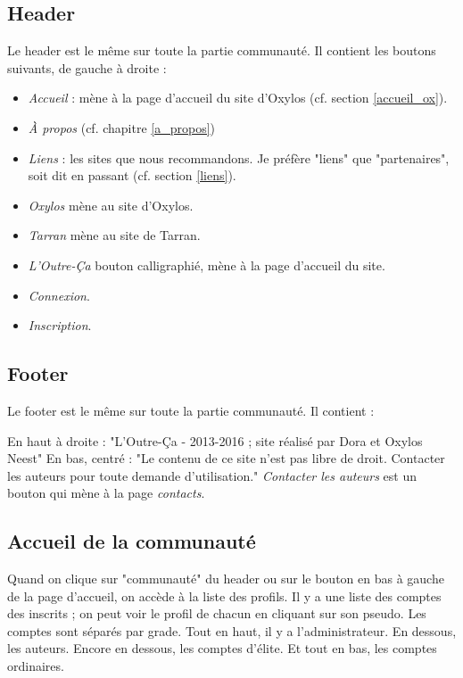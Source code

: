 \documentclass[french]{report}
\theoremstyle{plain}
\begin{document}
		\subsection{Header}
			Le header est le même sur toute la partie communauté. Il contient les boutons suivants, de gauche à droite :
			\begin{itemize}
				\item \emph{Accueil} : mène à la page d'accueil du site d'Oxylos (cf. section \ref{accueil_ox}).
				\item \emph{À propos} (cf. chapitre \ref{a_propos})
				\item \emph{Liens} : les sites que nous recommandons. Je préfère "liens" que "partenaires", soit dit en passant (cf. section \ref{liens}).
				\item \emph{Oxylos} mène au site d'Oxylos.
				\item \emph{Tarran} mène au site de Tarran.
				\item \emph{L'Outre-Ça} bouton calligraphié, mène à la page d'accueil du site.
				\item \emph{Connexion}.
				\item \emph{Inscription}.
			\end{itemize}

		\subsection{Footer}
			Le footer est le même sur toute la partie communauté. Il contient :

			En haut à droite : "L'Outre-Ça - 2013-2016 ; site réalisé par Dora et Oxylos Neest"
			En bas, centré : "Le contenu de ce site n'est pas libre de droit. Contacter les auteurs pour toute demande d'utilisation." \emph{Contacter les auteurs} est un bouton qui mène à la page \emph{contacts}.



		\subsection{Accueil de la communauté} \label{accueil_comm}
			Quand on clique sur "communauté" du header ou sur le bouton en bas à gauche de la page d'accueil, on accède à la liste des profils. Il y a une liste des comptes des inscrits ; on peut voir le profil de chacun en cliquant sur son pseudo. Les comptes sont séparés par grade. Tout en haut, il y a l'administrateur. En dessous, les auteurs. Encore en dessous, les comptes d'élite. Et tout en bas, les comptes ordinaires.
\end{document}
